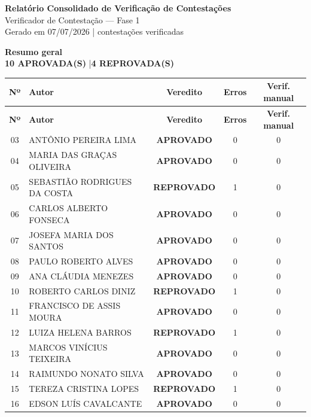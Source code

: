 \documentclass[12pt,a4paper]{article}
\begin{document}
\begin{center}
  {\LARGE \textbf{Relatório Consolidado de Verificação de Contestações}}\\[0.4em]
  {\large Verificador de Contestação --- Fase 1}\\[0.2em]
  {\small Gerado em 07/07/2026 \quad| contestações verificadas}
\end{center}

\vspace{0.8em}

\noindent\colorbox{cinzaClaro}{%
  \begin{minipage}{\dimexpr\linewidth-2\fboxsep}
    \centering
    \vspace{0.4em}
    {\large \textbf{Resumo geral}}\\[0.3em]
    \textcolor{corOK}{\textbf{10 APROVADA(S)}} \quad|\quad \textcolor{corERRO}{\textbf{4 REPROVADA(S)}}
    \vspace{0.4em}
  \end{minipage}%
}

\vspace{1em}

\begin{longtable}{c p{6.5cm} c c c}
  \toprule
  \textbf{Nº} & \textbf{Autor} & \textbf{Veredito} & \textbf{Erros} & \textbf{Verif. manual} \\
  \midrule
  \endfirsthead
  \toprule
  \textbf{Nº} & \textbf{Autor} & \textbf{Veredito} & \textbf{Erros} & \textbf{Verif. manual} \\
  \midrule
  \endhead
  03 & ANTÔNIO PEREIRA LIMA & \textcolor{corOK}{\textbf{APROVADO}} & 0 & 0 \\
  04 & MARIA DAS GRAÇAS OLIVEIRA & \textcolor{corOK}{\textbf{APROVADO}} & 0 & 0 \\
  05 & SEBASTIÃO RODRIGUES DA COSTA & \textcolor{corERRO}{\textbf{REPROVADO}} & 1 & 0 \\
  06 & CARLOS ALBERTO FONSECA & \textcolor{corOK}{\textbf{APROVADO}} & 0 & 0 \\
  07 & JOSEFA MARIA DOS SANTOS & \textcolor{corOK}{\textbf{APROVADO}} & 0 & 0 \\
  08 & PAULO ROBERTO ALVES & \textcolor{corOK}{\textbf{APROVADO}} & 0 & 0 \\
  09 & ANA CLÁUDIA MENEZES & \textcolor{corOK}{\textbf{APROVADO}} & 0 & 0 \\
  10 & ROBERTO CARLOS DINIZ & \textcolor{corERRO}{\textbf{REPROVADO}} & 1 & 0 \\
  11 & FRANCISCO DE ASSIS MOURA & \textcolor{corOK}{\textbf{APROVADO}} & 0 & 0 \\
  12 & LUIZA HELENA BARROS & \textcolor{corERRO}{\textbf{REPROVADO}} & 1 & 0 \\
  13 & MARCOS VINÍCIUS TEIXEIRA & \textcolor{corOK}{\textbf{APROVADO}} & 0 & 0 \\
  14 & RAIMUNDO NONATO SILVA & \textcolor{corOK}{\textbf{APROVADO}} & 0 & 0 \\
  15 & TEREZA CRISTINA LOPES & \textcolor{corERRO}{\textbf{REPROVADO}} & 1 & 0 \\
  16 & EDSON LUÍS CAVALCANTE & \textcolor{corOK}{\textbf{APROVADO}} & 0 & 0 \\
  \bottomrule
\end{longtable}
\end{document}
